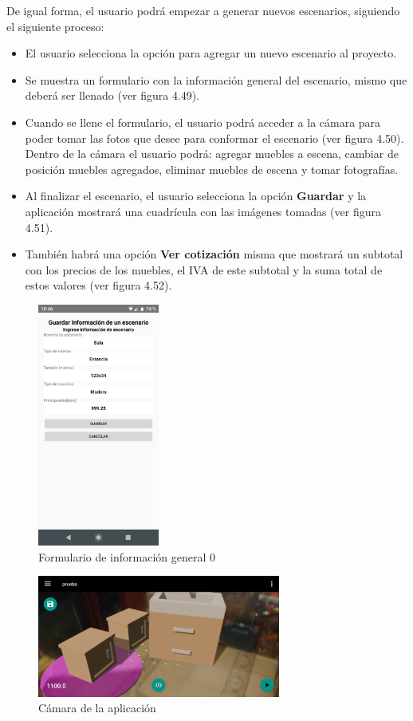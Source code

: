 \clearpage

De igual forma, el usuario podrá empezar a generar nuevos escenarios, siguiendo el siguiente proceso:
\begin{itemize}
	\item El usuario selecciona la opción para agregar un nuevo escenario al proyecto.
	\item Se muestra un formulario con la información general del escenario, mismo que deberá ser llenado (ver figura 4.49).
	\item Cuando se llene el formulario, el usuario podrá acceder a la cámara para poder tomar las fotos que desee para conformar el escenario (ver figura 4.50). Dentro de la cámara el usuario podrá: agregar muebles a escena, cambiar de posición muebles agregados, eliminar muebles de escena y tomar fotografías.
	\item Al finalizar el escenario, el usuario selecciona la opción \textbf{Guardar} y la aplicación mostrará una cuadrícula con las imágenes tomadas (ver figura 4.51).
	\item También habrá una opción \textbf{Ver cotización} misma que mostrará un subtotal con los precios de los muebles, el IVA de este subtotal y la suma total de estos valores (ver figura 4.52).
\end{itemize}


\begin{figure}[h!]
		\centering
		\includegraphics[width=4cm,height=8cm]{imagenes/desarrollo/app/presave_scenario.png}
		\caption{Formulario de información general   0}
		\label{fig:infosc}	
\end{figure}
\begin{figure}[h!]
	\centering
	\includegraphics[width=8cm,height=4cm]{imagenes/desarrollo/app/camera01.png}
	\caption{Cámara de la aplicación}
	\label{fig:camera01}
\end{figure}

